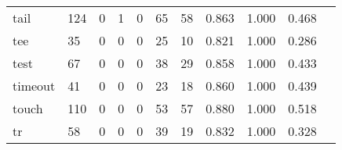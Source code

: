 \begin{longtable}{lp{1.2cm}p{1.2cm}p{1.2cm}p{1.2cm}p{1.2cm}p{1.2cm}p{1.2cm}p{1.2cm}p{1.2cm}p{1.2cm}}
tail      &                                   124 &                                                  0 &                                                  1 &                                                  0 &                                                 65 &                                                 58 &                                         0.863 &                                              1.000 &                                              0.468 \\
tee       &                                    35 &                                                  0 &                                                  0 &                                                  0 &                                                 25 &                                                 10 &                                         0.821 &                                              1.000 &                                              0.286 \\
test      &                                    67 &                                                  0 &                                                  0 &                                                  0 &                                                 38 &                                                 29 &                                         0.858 &                                              1.000 &                                              0.433 \\
timeout   &                                    41 &                                                  0 &                                                  0 &                                                  0 &                                                 23 &                                                 18 &                                         0.860 &                                              1.000 &                                              0.439 \\
touch     &                                   110 &                                                  0 &                                                  0 &                                                  0 &                                                 53 &                                                 57 &                                         0.880 &                                              1.000 &                                              0.518 \\
tr        &                                    58 &                                                  0 &                                                  0 &                                                  0 &                                                 39 &                                                 19 &                                         0.832 &                                              1.000 &                                              0.328 \\

\end{longtable}
